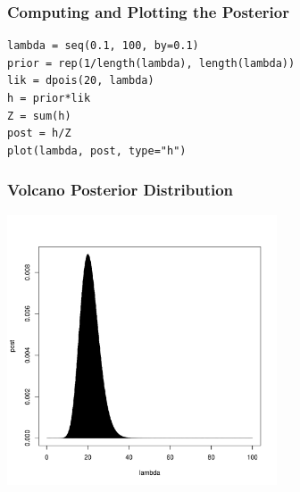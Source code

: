 \documentclass{beamer}
\begin{document}
\begin{frame}[fragile]
\frametitle{Computing and Plotting the Posterior}
\begin{verbatim}
lambda = seq(0.1, 100, by=0.1)
prior = rep(1/length(lambda), length(lambda))
lik = dpois(20, lambda)
h = prior*lik
Z = sum(h)
post = h/Z
plot(lambda, post, type="h")
\end{verbatim}

\end{frame}



\begin{frame}[fragile]
\frametitle{Volcano Posterior Distribution}

\centering
\includegraphics[width=0.6\textwidth]{images/volcano.pdf}

\end{frame}
\end{document}
